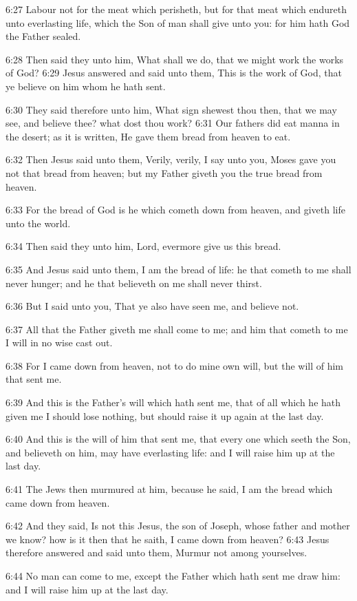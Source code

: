 6:27 Labour not for the meat which perisheth, but for that meat which endureth unto everlasting life, which the Son of man shall give unto you: for him hath God the Father sealed.

6:28 Then said they unto him, What shall we do, that we might work the works of God?  6:29 Jesus answered and said unto them, This is the work of God, that ye believe on him whom he hath sent.

6:30 They said therefore unto him, What sign shewest thou then, that we may see, and believe thee? what dost thou work?  6:31 Our fathers did eat manna in the desert; as it is written, He gave them bread from heaven to eat.

6:32 Then Jesus said unto them, Verily, verily, I say unto you, Moses gave you not that bread from heaven; but my Father giveth you the true bread from heaven.

6:33 For the bread of God is he which cometh down from heaven, and giveth life unto the world.

6:34 Then said they unto him, Lord, evermore give us this bread.

6:35 And Jesus said unto them, I am the bread of life: he that cometh to me shall never hunger; and he that believeth on me shall never thirst.

6:36 But I said unto you, That ye also have seen me, and believe not.

6:37 All that the Father giveth me shall come to me; and him that cometh to me I will in no wise cast out.

6:38 For I came down from heaven, not to do mine own will, but the will of him that sent me.

6:39 And this is the Father's will which hath sent me, that of all which he hath given me I should lose nothing, but should raise it up again at the last day.

6:40 And this is the will of him that sent me, that every one which seeth the Son, and believeth on him, may have everlasting life: and I will raise him up at the last day.

6:41 The Jews then murmured at him, because he said, I am the bread which came down from heaven.

6:42 And they said, Is not this Jesus, the son of Joseph, whose father and mother we know? how is it then that he saith, I came down from heaven?  6:43 Jesus therefore answered and said unto them, Murmur not among yourselves.

6:44 No man can come to me, except the Father which hath sent me draw him: and I will raise him up at the last day.

